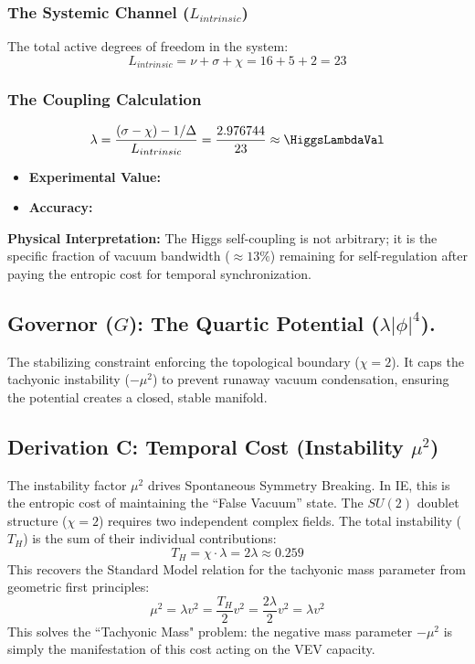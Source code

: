 \subsubsection{The Systemic Channel (\texorpdfstring{$L_{intrinsic}$}{Hsys})}
The total active degrees of freedom in the system:
\begin{equation}
L_{intrinsic} = \nu + \sigma + \chi = 16 + 5 + 2 = 23
\end{equation}

\subsubsection{The Coupling Calculation}
\begin{equation}
\lambda = \frac{(\sigma - \chi) - 1/\Delta}{L_{intrinsic}} = \frac{2.976744}{23} \approx \mathbf{\HiggsLambdaVal}
\end{equation}
\begin{itemize}
    \item \textbf{Experimental Value:} \HiggsLambdaExperimentalValue
    \item \textbf{Accuracy:} \HiggsLambdaAccText
\end{itemize}

\textbf{Physical Interpretation:} The Higgs self-coupling is not arbitrary; it is the specific fraction of vacuum bandwidth ($\approx 13\%$) remaining for self-regulation after paying the entropic cost for temporal synchronization.

\subsection{Governor (\texorpdfstring{$G$}{G}): The Quartic Potential (\texorpdfstring{$\lambda|\phi|^4$}{lambdaphi4}).}
The stabilizing constraint enforcing the topological boundary ($\chi=2$). It caps the tachyonic instability ($-\mu^2$) to prevent runaway vacuum condensation, ensuring the potential creates a closed, stable manifold.


\subsection{Derivation C: Temporal Cost (Instability \texorpdfstring{$\mu^2$}{mu})}
The instability factor $\mu^2$ drives Spontaneous Symmetry Breaking. In IE, this is the entropic cost of maintaining the ``False Vacuum'' state. The $SU(2)$ doublet structure ($\chi=2$) requires two independent complex fields. The total instability ($T_H$) is the sum of their individual contributions:
\begin{equation}
T_H = \chi \cdot \lambda = 2\lambda \approx 0.259
\end{equation}
This recovers the Standard Model relation for the tachyonic mass parameter from geometric first principles:
\begin{equation}
\mu^2 = \lambda v^2 = \frac{T_H}{2} v^2 = \frac{2\lambda}{2} v^2 = \lambda v^2
\end{equation}
This solves the ``Tachyonic Mass" problem: the negative mass parameter $-\mu^2$ is simply the manifestation of this cost acting on the VEV capacity.

